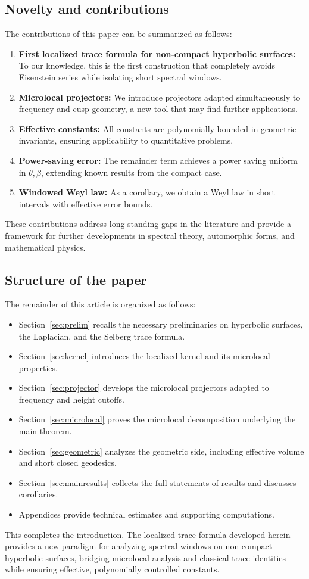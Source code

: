 \subsection{Novelty and contributions}

The contributions of this paper can be summarized as follows:

\begin{enumerate}
  \item \textbf{First localized trace formula for non-compact hyperbolic surfaces:} To our knowledge, this is the first construction that completely avoids Eisenstein series while isolating short spectral windows.
  \item \textbf{Microlocal projectors:} We introduce projectors adapted simultaneously to frequency and cusp geometry, a new tool that may find further applications.
  \item \textbf{Effective constants:} All constants are polynomially bounded in geometric invariants, ensuring applicability to quantitative problems.
  \item \textbf{Power-saving error:} The remainder term achieves a power saving uniform in $\theta,\beta$, extending known results from the compact case.
  \item \textbf{Windowed Weyl law:} As a corollary, we obtain a Weyl law in short intervals with effective error bounds.
\end{enumerate}

These contributions address long-standing gaps in the literature and provide a framework for further developments in spectral theory, automorphic forms, and mathematical physics.

\subsection{Structure of the paper}

The remainder of this article is organized as follows:

\begin{itemize}
  \item Section~\ref{sec:prelim} recalls the necessary preliminaries on hyperbolic surfaces, the Laplacian, and the Selberg trace formula.
  \item Section~\ref{sec:kernel} introduces the localized kernel and its microlocal properties.
  \item Section~\ref{sec:projector} develops the microlocal projectors adapted to frequency and height cutoffs.
  \item Section~\ref{sec:microlocal} proves the microlocal decomposition underlying the main theorem.
  \item Section~\ref{sec:geometric} analyzes the geometric side, including effective volume and short closed geodesics.
  \item Section~\ref{sec:mainresults} collects the full statements of results and discusses corollaries.
  \item Appendices provide technical estimates and supporting computations.
\end{itemize}

This completes the introduction. The localized trace formula developed herein provides a new paradigm for analyzing spectral windows on non-compact hyperbolic surfaces, bridging microlocal analysis and classical trace identities while ensuring effective, polynomially controlled constants.
